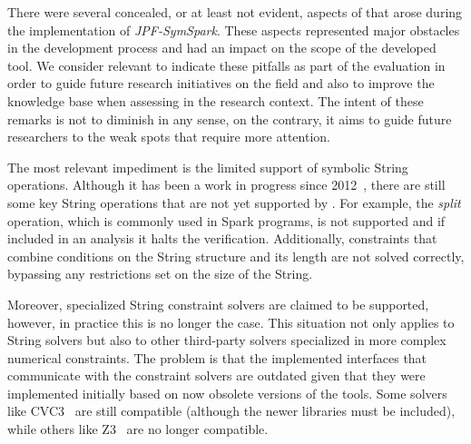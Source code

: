
\label{sec:limitations}

%
%
%
%


There were several concealed, or at least not evident, aspects of \spf{} that arose during the implementation of \textit{JPF-SymSpark}. These aspects represented major obstacles in the development process and had an impact on the scope of the developed tool. We consider relevant to indicate these pitfalls as part of the evaluation in order to guide future research initiatives on the field and also to improve the knowledge base when assessing \spf{} in the research context. The intent of these remarks is not to diminish \spf{} in any sense, on the contrary, it aims to guide future researchers to the weak spots that require more attention.

The most relevant impediment is the limited support of symbolic String operations. Although it has been a work in progress since 2012~\cite{Redelinghuys2012,Pasareanu2013}, there are still some key String operations that are not yet supported by \spf{}. For example, the \textit{split} operation, which is commonly used in Spark programs, is not supported and if included in an analysis it halts the verification. Additionally, constraints that combine conditions on the String structure and its length are not solved correctly, bypassing any restrictions set on the size of the String.

Moreover, specialized String constraint solvers are claimed to be supported, however, in practice this is no longer the case. This situation not only applies to String solvers but also to other third-party solvers specialized in more complex numerical constraints. The problem is that the implemented interfaces that communicate with the constraint solvers are outdated given that they were implemented initially based on now obsolete versions of the tools. Some solvers like CVC3~\cite{Barrett2007} are still compatible (although the newer libraries must be included), while others like Z3~\cite{DeMoura2008} are no longer compatible.

